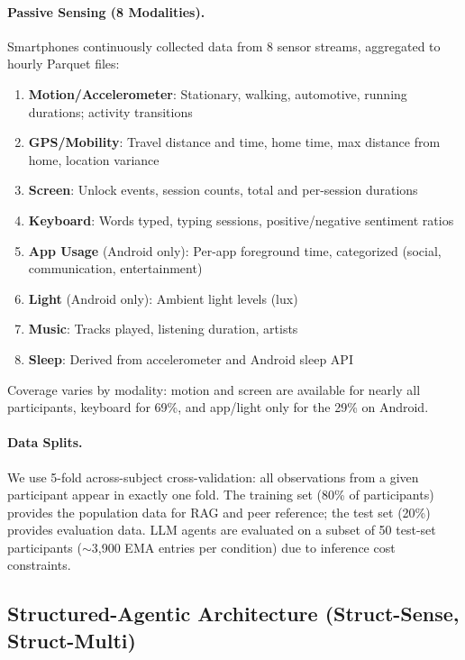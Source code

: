 \documentclass[screen,review,anonymous]{acmart}
\begin{document}
\paragraph{Passive Sensing (8 Modalities).}
Smartphones continuously collected data from 8 sensor streams, aggregated to hourly Parquet files:

\begin{enumerate}[nosep]
    \item \textbf{Motion/Accelerometer}: Stationary, walking, automotive, running durations; activity transitions
    \item \textbf{GPS/Mobility}: Travel distance and time, home time, max distance from home, location variance
    \item \textbf{Screen}: Unlock events, session counts, total and per-session durations
    \item \textbf{Keyboard}: Words typed, typing sessions, positive/negative sentiment ratios
    \item \textbf{App Usage} (Android only): Per-app foreground time, categorized (social, communication, entertainment)
    \item \textbf{Light} (Android only): Ambient light levels (lux)
    \item \textbf{Music}: Tracks played, listening duration, artists
    \item \textbf{Sleep}: Derived from accelerometer and Android sleep API
\end{enumerate}

\noindent Coverage varies by modality: motion and screen are available for nearly all participants, keyboard for 69\%, and app/light only for the 29\% on Android.

\paragraph{Data Splits.}
We use 5-fold across-subject cross-validation: all observations from a given participant appear in exactly one fold. The training set (80\% of participants) provides the population data for RAG and peer reference; the test set (20\%) provides evaluation data. LLM agents are evaluated on a subset of 50 test-set participants (${\sim}$3,900 EMA entries per condition) due to inference cost constraints.

\subsection{Structured-Agentic Architecture (Struct-Sense, Struct-Multi)}
\end{document}
